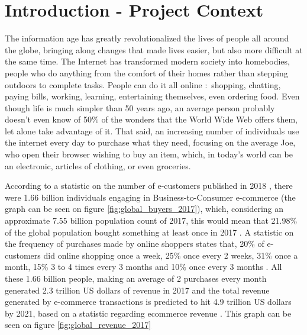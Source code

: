 \documentclass[12pt,a4paper,twoside]{report}
\begin{document}
\newpage

\tableofcontents
\newpage

\setcounter{page}{1}


\chapter{Introduction - Project Context}
\pagestyle{headings}

The information age has greatly revolutionalized the lives of people all around the globe, bringing along changes that made lives easier, but also more difficult at the same time. The Internet has transformed modern society into homebodies, people who do anything from the comfort of their homes rather than stepping outdoors to complete tasks. People can do it all online : shopping, chatting, paying bills, working, learning, entertaining themselves, even ordering food. Even though life is much simpler than 50 years ago, an average person probably doesn't even know of 50\% of the wonders that the World Wide Web offers them, let alone take advantage of it. That said, an increasing number of individuals use the internet every day to purchase what they need, focusing on the average Joe, who open their browser wishing to buy an item, which, in today's world can be an electronic, articles of clothing, or even groceries.

According to a statistic on the number of e-customers published in 2018 \cite{global_buyers_2017}, there were 1.66 billion individuals engaging in Business-to-Consumer e-commerce (the graph can be seen on figure \ref{fig:global_buyers_2017}), which, considering an approximate 7.55 billion population count of 2017, this would mean that 21.98\% of the global population bought something at least once in 2017 . A statistic on the frequency of purchases made by online shoppers \cite{global_frequency_2018} states that, 20\% of e-customers did online shopping once a week, 25\% once every 2 weeks, 31\% once a month, 15\% 3 to 4 times every 3 months and 10\% once every 3 months . All these 1.66 billion people, making an average of 2 purchases every month generated 2.3 trillion US dollars of revenue in 2017 and the total revenue generated by e-commerce transactions is predicted to hit 4.9 trillion US dollars by 2021, based on a statistic regarding ecommerce revenue \cite{global_revenue_2017}. This graph can be seen on figure \ref{fig:global_revenue_2017}
\end{document}

